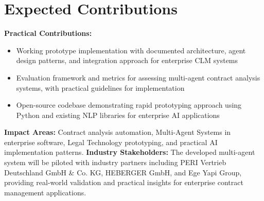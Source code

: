 
\section{Expected Contributions}\label{section:expected_contributions}


\textbf{Practical Contributions:}
\begin{itemize}
    \item Working prototype implementation with documented architecture, agent design patterns, and integration approach for enterprise CLM systems
    \item Evaluation framework and metrics for assessing multi-agent contract analysis systems, with practical guidelines for implementation
    \item Open-source codebase demonstrating rapid prototyping approach using Python and existing NLP libraries for enterprise AI applications
\end{itemize}

\textbf{Impact Areas:} Contract analysis automation, Multi-Agent Systems in enterprise software, Legal Technology prototyping, and practical AI implementation patterns.
\newline
\break
\textbf{Industry Stakeholders:} The developed multi-agent system will be piloted with industry partners including PERI Vertrieb Deutschland GmbH \& Co. KG, HEBERGER GmbH, and Ege Yapi Group, providing real-world validation and practical insights for enterprise contract management applications.
